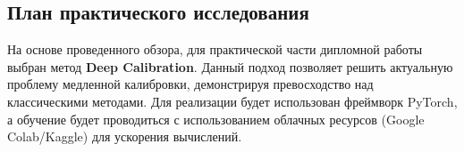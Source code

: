\subsection{План практического исследования}
На основе проведенного обзора, для практической части дипломной работы выбран метод \textbf{Deep Calibration}. Данный подход позволяет решить актуальную проблему медленной калибровки, демонстрируя превосходство над классическими методами.
Для реализации будет использован фреймворк PyTorch, а обучение будет проводиться с использованием облачных ресурсов (Google Colab/Kaggle) для ускорения вычислений.

\newpage
